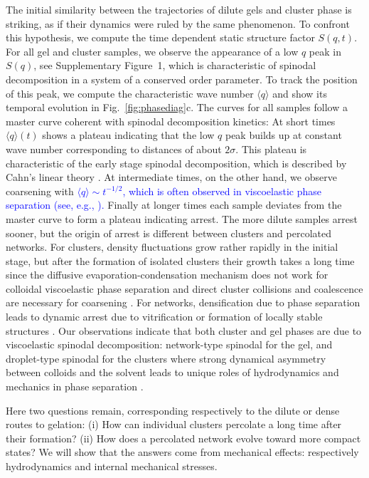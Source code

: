 \documentclass[footinbib,amsmath,amssymb,superscriptaddress,twocolumn]{revtex4}
\begin{document}
The initial similarity between the trajectories of dilute gels and cluster phase is striking, as if their dynamics were ruled by the same phenomenon. To confront this hypothesis, we compute the time dependent static structure factor $S(q,t)$. For all gel and cluster samples, we observe the appearance of a low $q$ peak in $S(q)$, see Supplementary Figure~1, which is characteristic of spinodal decomposition in a system of a conserved order parameter. To track the position of this peak, we compute the characteristic wave number $\langle q \rangle$ and show its temporal evolution in Fig.~\ref{fig:phasediag}c. The curves for all samples follow a master curve coherent with spinodal decomposition kinetics: At short times $\langle q \rangle(t)$ shows a plateau indicating that the low $q$ peak builds up at constant wave number corresponding to distances of about $2\sigma$. This plateau is characteristic of the early stage spinodal decomposition, which is described by Cahn's linear theory \cite{onuki2002phase}. At intermediate times, on the other hand, we observe coarsening with \textcolor{blue}{$\langle q \rangle \sim t^{-1/2}$, which is often observed in viscoelastic phase separation 
(see, e.g., \cite{Furukawa2010}).} Finally at longer times each sample deviates from the master curve to form a plateau indicating arrest. The more dilute samples arrest sooner, 
but the origin of arrest is different between clusters and percolated networks. For clusters, density fluctuations grow rather rapidly in the initial stage, but after the formation of isolated clusters their growth takes a long time since the diffusive evaporation-condensation mechanism does not work for colloidal viscoelastic phase separation and direct cluster collisions and coalescence are necessary for coarsening \cite{tanaka2000viscoelastic}. For networks, densification due to phase separation leads to dynamic arrest due to vitrification \cite{piazza1994phase,verhaegh1997,tanaka1999colloid,poon2002,zaccarelli2007,lu2008gelation} or formation of locally stable structures \cite{royall2008g}. 
Our observations indicate that both cluster and gel phases are due to viscoelastic spinodal decomposition: network-type spinodal for the gel, and droplet-type spinodal for the clusters where strong dynamical asymmetry between colloids and the solvent leads to unique roles of hydrodynamics and mechanics in phase separation \cite{tanaka1999colloid,tanaka2000viscoelastic}.

Here two questions remain, corresponding respectively to the dilute or dense routes to gelation: (i) How can individual clusters percolate a long time after their formation? (ii) How does a percolated network evolve toward more compact states? We will show that the answers come from mechanical effects: respectively hydrodynamics and internal mechanical stresses.
\end{document}
